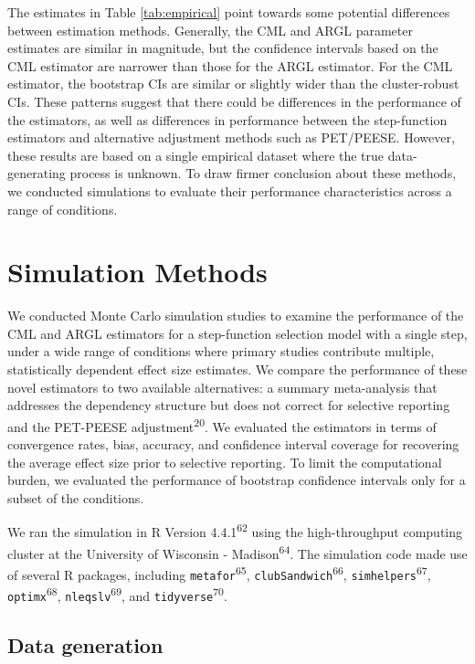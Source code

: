 \documentclass[
  american,
  man, donotrepeattitle,floatsintext]{apa7}
\begin{document}
The estimates in Table \ref{tab:empirical} point towards some potential differences between estimation methods.
Generally, the CML and ARGL parameter estimates are similar in magnitude, but the confidence intervals based on the CML estimator are narrower than those for the ARGL estimator.
For the CML estimator, the bootstrap CIs are similar or slightly wider than the cluster-robust CIs.
These patterns suggest that there could be differences in the performance of the estimators, as well as differences in performance between the step-function estimators and alternative adjustment methods such as PET/PEESE.
However, these results are based on a single empirical dataset where the true data-generating process is unknown.
To draw firmer conclusion about these methods, we conducted simulations to evaluate their performance characteristics across a range of conditions.

\section{Simulation Methods}\label{simulation-methods}

We conducted Monte Carlo simulation studies to examine the performance
of the CML and ARGL estimators for a step-function selection model with a single step, under a wide range of conditions where primary studies contribute multiple, statistically dependent effect size estimates.
We compare the performance of these novel estimators to two available alternatives: a summary meta-analysis that addresses the dependency structure but does not correct for selective reporting and the PET-PEESE adjustment\textsuperscript{20}.
We evaluated the estimators in terms of convergence rates, bias, accuracy, and confidence interval coverage for recovering the average effect size prior to selective reporting.
To limit the computational burden, we evaluated the performance of bootstrap confidence intervals only for a subset of the conditions.

We ran the simulation in R Version 4.4.1\textsuperscript{62} using the high-throughput computing cluster at the University of Wisconsin - Madison\textsuperscript{64}.
The simulation code made use of several R packages, including \texttt{metafor}\textsuperscript{65}, \texttt{clubSandwich}\textsuperscript{66}, \texttt{simhelpers}\textsuperscript{67}, \texttt{optimx}\textsuperscript{68}, \texttt{nleqslv}\textsuperscript{69}, and \texttt{tidyverse}\textsuperscript{70}.

\subsection{Data generation}\label{data-generation}
\end{document}
